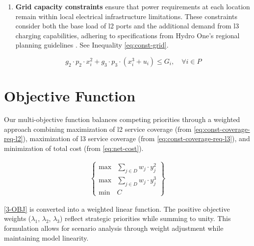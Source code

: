 \begin{enumerate}
    \begin{align}
        \sum_{j \in D}(w_j \cdot y^2_j) & \geq \alpha_2
        \label {eq:const-coverage-req-l2} \\
        \sum_{j \in D}(w_j \cdot y^3_j) & \geq \alpha_3
        \label{eq:const-coverage-req-l3}
    \end{align}

    \item \textbf{Grid capacity constraints} ensure that power requirements at each location remain within local electrical infrastructure limitations. These constraints consider both the base load of \gls{l2} ports and the additional demand from \gls{l3} charging capabilities, adhering to specifications from Hydro One's regional planning guidelines \cite{hydro_kwcg_2021} \cite{hydro_kwcg_2024}. See Inequality \ref{eq:const-grid}.

    \begin{equation}
        g_2 \cdot p_2 \cdot x^2_i + g_3 \cdot p_3 \cdot (x^3_i + u_i) \leq G_i, \quad \forall i \in P
        \label{eq:const-grid}
    \end{equation}
\end{enumerate} 

\section{Objective Function}

Our multi-objective function balances competing priorities through a weighted approach combining maximization of \gls{l2} service coverage (from \ref{eq:const-coverage-req-l2}), maximization of \gls{l3} service coverage (from \ref{eq:const-coverage-req-l3}), and minimization of total cost (from \ref{eq:net-cost}).

\begin{align}
    \left\{
    \begin{array}{ll}
        \max & \sum\limits_{j \in D} w_j \cdot y^2_j \\[1.5em]
        \max & \sum\limits_{j \in D} w_j \cdot y^3_j \\[1.5em]
        \min & C
    \end{array}
    \right\} \tag{3-OBJ} \label{3-OBJ}
\end{align}

\eqref{3-OBJ} is converted into a weighted linear function. The positive objective weights ($\lambda_1$, $\lambda_2$, $\lambda_3$) reflect strategic priorities while summing to unity. This formulation allows for scenario analysis through weight adjustment while maintaining model linearity.


